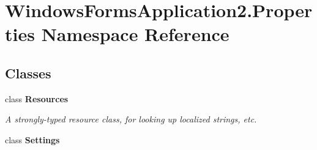 \hypertarget{namespace_windows_forms_application2_1_1_properties}{}\section{Windows\+Forms\+Application2.\+Properties Namespace Reference}
\label{namespace_windows_forms_application2_1_1_properties}
\subsection*{Classes}
\begin{DoxyCompactItemize}
\item 
class {\bfseries Resources}
\begin{DoxyCompactList}\small\item\em A strongly-\/typed resource class, for looking up localized strings, etc. \end{DoxyCompactList}\item 
class {\bfseries Settings}
\end{DoxyCompactItemize}
